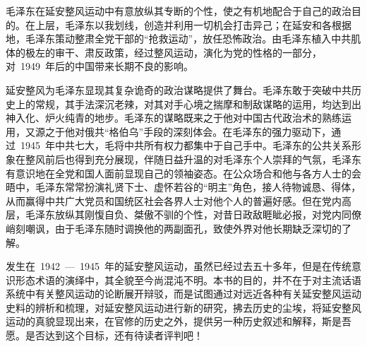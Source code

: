 \begin{pre-post-text}
毛泽东在延安整风运动中有意放纵其专断的个性，使之有机地配合于自己的政治目的。在上层，毛泽东以我划线，创造并利用一切机会打击异己；在延安和各根据地，毛泽东策动整肃全党干部的“抢救运动”，放任恐怖政治。由毛泽东植入中共肌体的极左的审干、肃反政策，经过整风运动，演化为党的性格的一部分，对~1949~年后的中国带来长期不良的影响。

延安整风为毛泽东显现其复杂诡奇的政治谋略提供了舞台。毛泽东敢于突破中共历史上的常规，其手法深沉老辣，对其对手心境之揣摩和制敌谋略的运用，均达到出神入化、炉火纯青的地步。毛泽东的谋略既来之于他对中国古代政治术的熟练运用，又源之于他对俄共“格伯乌”手段的深刻体会。在毛泽东的强力驱动下，通过~1945~年中共七大，毛将中共所有权力都集中于自己手中。毛泽东的公共关系形象在整风前后也得到充分展现，伴随日益升温的对毛泽东个人崇拜的气氛，毛泽东有意识地在全党和国人面前显现自己的领袖姿态。在公众场合和他与各方人士的会晤中，毛泽东常常扮演礼贤下士、虚怀若谷的“明主”角色，接人待物诚恳、得体，从而赢得中共广大党员和国统区社会各界人士对他个人的普遍好感。但在党内高层，毛泽东放纵其刚愎自负、桀傲不驯的个性，对昔日政敌睚眦必报，对党内同僚峭刻嘲讽，由于毛泽东随时调换他的两副面孔，致使外界对他长期缺乏深切的了解。

发生在~1942~—~1945~年的延安整风运动，虽然已经过去五十多年，但是在传统意识形态术语的演绎中，其全貌至今尚混沌不明。本书的目的，并不在于对主流话语系统中有关整风运动的论断展开辩驳，而是试图通过对远近各种有关延安整风运动史料的辨析和梳理，对延安整风运动进行新的研究，拂去历史的尘埃，将延安整风运动的真貌显现出来，在官修的历史之外，提供另一种历史叙述和解释，斯是吾愿。是否达到这个目标，还有待读者评判吧！
\end{pre-post-text}

